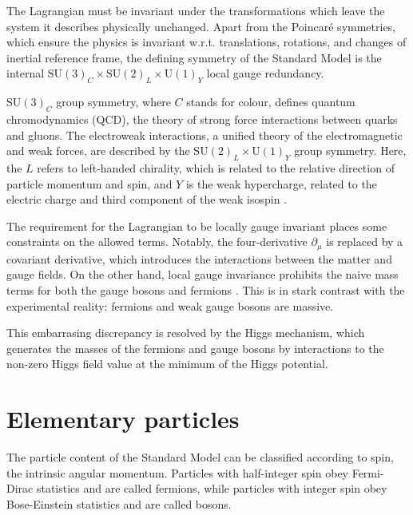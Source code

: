 The Lagrangian must be invariant under the transformations which leave the
system it describes physically unchanged. Apart from the Poincar\'e symmetries, which
ensure the physics is invariant w.r.t. translations, rotations, and changes of inertial
reference frame, the defining symmetry of the Standard Model is the internal
$\text{SU}(3)_C \times \text{SU}(2)_L \times \text{U}(1)_Y$ local gauge redundancy.

$\text{SU}(3)_C$ group symmetry, where $C$ stands for colour, defines quantum chromodynamics
(QCD), the theory of strong force interactions between quarks and gluons. The electroweak
interactions, a unified theory of the electromagnetic and weak forces, are described by
the $\text{SU}(2)_L \times \text{U}(1)_Y$ group symmetry. Here, the $L$ refers to left-handed
chirality, which is related to the relative direction of particle momentum and spin, and
$Y$ is the weak hypercharge, related to the electric charge and third component of the
weak isospin \cite{Thomson:2013zua}.

The requirement for the Lagrangian to be locally gauge invariant places some constraints
on the allowed terms. Notably, the four-derivative $\partial_\mu$ is replaced by a 
covariant derivative, which introduces the interactions between the matter and gauge
fields. On the other hand, local gauge invariance prohibits the naive mass terms for
both the gauge bosons and fermions \cite{Thomson:2013zua}. This is in stark contrast
with the experimental reality: fermions and weak gauge bosons are massive.

This embarrasing discrepancy is resolved by the Higgs mechanism, which generates the
masses of the fermions and gauge bosons by interactions to the non-zero Higgs field
value at the minimum of the Higgs potential.

\section{Elementary particles}

The particle content of the Standard Model can be classified according to spin, the
intrinsic angular momentum. Particles with half-integer spin obey Fermi-Dirac statistics
and are called fermions, while particles with integer spin obey Bose-Einstein
statistics and are called bosons.

